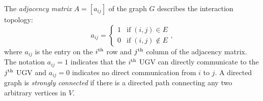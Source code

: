 	The \textit{adjacency matrix} $A=\left[ a_{ij}\right] $ of the graph $G$ describes the interaction topology:
	\small\begin{equation*}
		a_{ij}=\begin{cases}
			1& \text{if}\;\left(i,j\right)\in E\\
			0& \text{if}\;\left(i,j\right)\notin E
		\end{cases},
	\end{equation*} \normalsize
	where $a_{ij}$ is the entry on the $i^\text{th}$ row and $j^\text{th}$ column of the adjacency matrix. 
	The notation $a_{ij}=1$ indicates that the $i^\text{th}$ UGV can directly communicate to the $j^\text{th}$ UGV and $a_{ij}=0$ indicates no direct communication from $i$ to $j$.
	 A directed graph is \textit{strongly connected} if there is a directed path connecting any two arbitrary vertices in $V$. %
	
